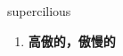 
\begin{frame}
{\huge supercilious}
\begin{center}
\begin{enumerate}\Large
  \item \textbf{高傲的，傲慢的}
\end{enumerate}
\end{center}
\end{frame}
